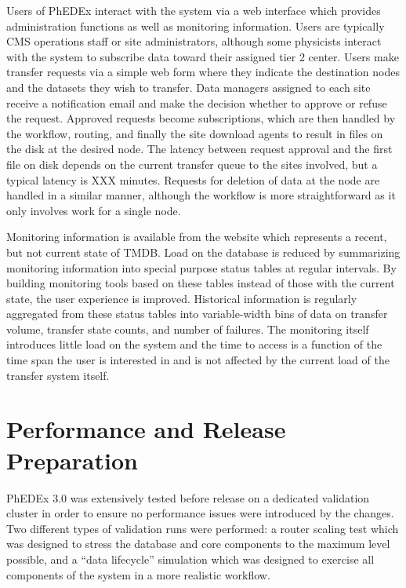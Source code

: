 \documentclass{PoS}
\begin{document}
Users of PhEDEx interact with the system via a web interface which
provides administration functions as well as monitoring information.
Users are typically CMS operations staff or site administrators,
although some physicists interact with the system to subscribe data
toward their assigned tier 2 center.  Users make transfer requests via
a simple web form where they indicate the destination nodes and the
datasets they wish to transfer.  Data managers assigned to each site
receive a notification email and make the decision whether to approve
or refuse the request.  Approved requests become subscriptions, which
are then handled by the workflow, routing, and finally the site
download agents to result in files on the disk at the desired node.
The latency between request approval and the first file on disk
depends on the current transfer queue to the sites involved, but a
typical latency is XXX minutes.  Requests for deletion of data at the
node are handled in a similar manner, although the workflow is more
straightforward as it only involves work for a single node.

Monitoring information is available from the website which represents
a recent, but not current state of TMDB.  Load on the database is
reduced by summarizing monitoring information into special purpose
status tables at regular intervals.  By building monitoring tools
based on these tables instead of those with the current state, the
user experience is improved.  Historical information is regularly
aggregated from these status tables into variable-width bins of data
on transfer volume, transfer state counts, and number of failures.
The monitoring itself introduces little load on the system and the
time to access is a function of the time span the user is interested
in and is not affected by the current load of the transfer system
itself.

\section{Performance and Release Preparation}

PhEDEx 3.0 was extensively tested before release on a dedicated
validation cluster in order to ensure no performance issues were
introduced by the changes.  Two different types of validation runs
were performed: a router scaling test which was designed to stress the
database and core components to the maximum level possible, and a
``data lifecycle'' simulation which was designed to exercise all
components of the system in a more realistic workflow.
\end{document}
